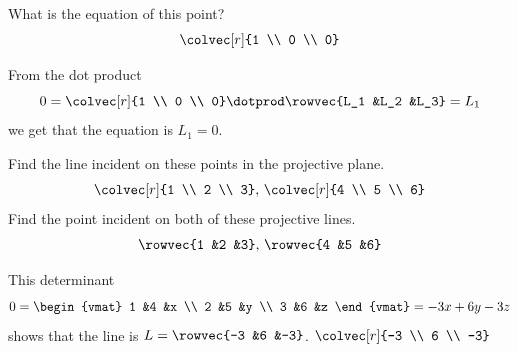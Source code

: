 \begin{exercises}
  \item 
    What is the equation of this point?
    \begin{equation*}
       \colvec[r]{1 \\ 0 \\ 0}
    \end{equation*}
    \begin{answer}
      From the dot product
      \begin{equation*}
        0=\colvec[r]{1 \\ 0 \\ 0}\dotprod\rowvec{L_1 &L_2 &L_3}
         =L_1
      \end{equation*}
      we get that the equation is $L_1=0$.
    \end{answer}
  \item 
    \begin{exparts}
      \partsitem Find the line incident on these points in the 
         projective plane.
         \begin{equation*}
           \colvec[r]{1 \\ 2 \\ 3},\,\colvec[r]{4 \\ 5 \\ 6}
         \end{equation*}
      \partsitem Find the point incident on both of 
         these projective lines. 
         \begin{equation*}
           \rowvec{1 &2 &3},\,\rowvec{4 &5 &6}
         \end{equation*} 
    \end{exparts}
    \begin{answer}
      \begin{exparts}
        \partsitem This determinant
          \begin{equation*}
            0=\begin{vmat}
              1  &4  &x \\
              2  &5  &y \\
              3  &6  &z
            \end{vmat}
            =-3x+6y-3z
          \end{equation*}
          shows that the line is $L=\rowvec{-3 &6 &-3}$.
        \partsitem $\colvec[r]{-3 \\ 6 \\ -3}$
      \end{exparts}
    \end{answer}

\end{exercises}
